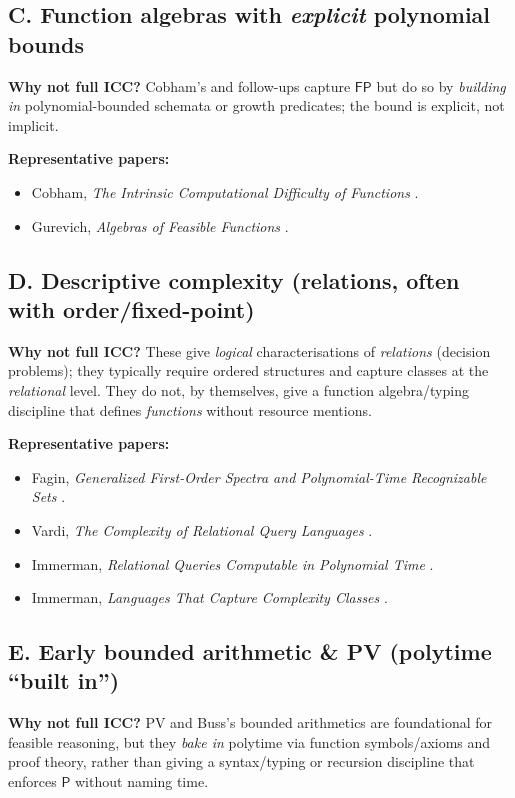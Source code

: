 \subsection*{C. Function algebras with \emph{explicit} polynomial bounds}
\textbf{Why not full ICC?} Cobham’s and follow-ups capture \(\mathsf{FP}\) but do so by \emph{building in}
polynomial-bounded schemata or growth predicates; the bound is explicit, not implicit.

\noindent\textbf{Representative papers:}
\begin{itemize}
  \item Cobham, \emph{The Intrinsic Computational Difficulty of Functions} \cite{Cobham1964}.
  \item Gurevich, \emph{Algebras of Feasible Functions} \cite{Gurevich1983}.
\end{itemize}

\subsection*{D. Descriptive complexity (relations, often with order/fixed-point)}
\textbf{Why not full ICC?} These give \emph{logical} characterisations of \emph{relations} (decision problems);
they typically require ordered structures and capture classes at the \emph{relational} level.
They do not, by themselves, give a function algebra/typing discipline that defines
\emph{functions} without resource mentions.

\noindent\textbf{Representative papers:}
\begin{itemize}
  \item Fagin, \emph{Generalized First-Order Spectra and Polynomial-Time Recognizable Sets} \cite{Fagin1974}.
  \item Vardi, \emph{The Complexity of Relational Query Languages} \cite{Vardi1982}.
  \item Immerman, \emph{Relational Queries Computable in Polynomial Time} \cite{Immerman1986}.
  \item Immerman, \emph{Languages That Capture Complexity Classes} \cite{Immerman1987}.
\end{itemize}

\subsection*{E. Early bounded arithmetic \& PV (polytime ``built in'')}
\textbf{Why not full ICC?} PV and Buss’s bounded arithmetics are foundational for feasible
reasoning, but they \emph{bake in} polytime via function symbols/axioms and proof theory,
rather than giving a syntax/typing or recursion discipline that enforces \(\mathsf{P}\) without
naming time.


